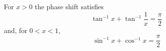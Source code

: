 \documentclass{article}
\begin{document}
For $x > 0$ the phase shift satisfies
\begin{equation}
\tan^{-1} x + \tan^{-1}\frac{1}{x} = \frac{\pi}{2}
\label{eq:arc1}
\end{equation}
and, for $0<x<1$,
\begin{equation}
\sin^{-1} x + \cos^{-1} x = \frac{\pi}{2}
\label{eq:arc2}
\end{equation}
\end{document}
